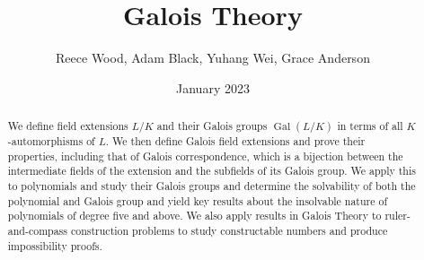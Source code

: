 \documentclass{uonmath-mgp}
\title{\textbf{Galois Theory}}
\author{Reece Wood, Adam Black, Yuhang Wei, Grace Anderson}
\date{January 2023}
\theoremstyle{definition}
\newcommand{\Gal}{\operatorname{Gal}}
\begin{document}
\begin{abstract}
    We define field extensions $L/K$ and their Galois groups $\Gal(L/K)$ in terms of all $K$-automorphisms of $L$. We then define Galois field extensions and prove their properties, including that of Galois correspondence, which is a bijection between the intermediate fields of the extension and the subfields of its Galois group. We apply this to polynomials and study their Galois groups and determine the solvability of both the polynomial and Galois group and yield key results about the insolvable nature of polynomials of degree five and above. We also apply results in Galois Theory to ruler-and-compass construction problems to study constructable numbers and produce impossibility proofs. 
\end{abstract}

\maketitle



\newpage 
{}
\tableofcontents



\newpage
{}










\newpage
{}
\appendix



\newpage
 
\end{document}
